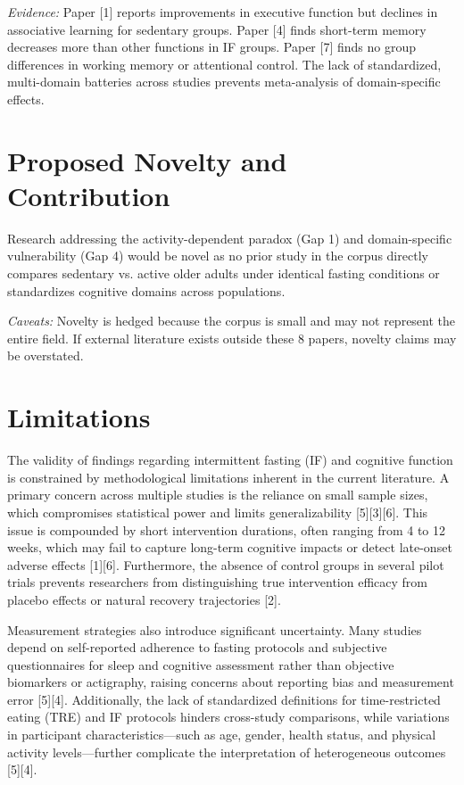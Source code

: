 \documentclass[conference]{IEEEtran}
\begin{document}
\textit{Evidence:} Paper [1] reports improvements in executive function but declines in associative learning for sedentary groups. Paper [4] finds short-term memory decreases more than other functions in IF groups. Paper [7] finds no group differences in working memory or attentional control. The lack of standardized, multi-domain batteries across studies prevents meta-analysis of domain-specific effects.

\section{Proposed Novelty and Contribution}
Research addressing the activity-dependent paradox (Gap 1) and domain-specific vulnerability (Gap 4) would be novel as no prior study in the corpus directly compares sedentary vs. active older adults under identical fasting conditions or standardizes cognitive domains across populations.

\textit{Caveats:} Novelty is hedged because the corpus is small and may not represent the entire field. If external literature exists outside these 8 papers, novelty claims may be overstated.

\section{Limitations}
The validity of findings regarding intermittent fasting (IF) and cognitive function is constrained by methodological limitations inherent in the current literature. A primary concern across multiple studies is the reliance on small sample sizes, which compromises statistical power and limits generalizability [5][3][6]. This issue is compounded by short intervention durations, often ranging from 4 to 12 weeks, which may fail to capture long-term cognitive impacts or detect late-onset adverse effects [1][6]. Furthermore, the absence of control groups in several pilot trials prevents researchers from distinguishing true intervention efficacy from placebo effects or natural recovery trajectories [2].

Measurement strategies also introduce significant uncertainty. Many studies depend on self-reported adherence to fasting protocols and subjective questionnaires for sleep and cognitive assessment rather than objective biomarkers or actigraphy, raising concerns about reporting bias and measurement error [5][4]. Additionally, the lack of standardized definitions for time-restricted eating (TRE) and IF protocols hinders cross-study comparisons, while variations in participant characteristics—such as age, gender, health status, and physical activity levels—further complicate the interpretation of heterogeneous outcomes [5][4].
\end{document}
